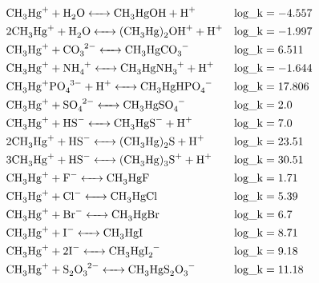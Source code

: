 \documentclass[12pt, a4paper]{article}
\begin{document}
\begin{align}
& \ce{CH3Hg+ + H2O <-> CH3HgOH + H+} && \mathrm{log\_k} =  -4.557 \\
& \ce{2 CH3Hg+ + H2O <-> (CH3Hg)2OH^+ + H+} && \mathrm{log\_k} =  -1.997 \\
& \ce{CH3Hg+ + CO_3^2- <-> CH3HgCO_3^-} && \mathrm{log\_k} =  6.511 \\
& \ce{CH3Hg+ + NH_4^+ <-> CH3HgNH_3^+ + H^+} && \mathrm{log\_k} =  -1.644 \\
& \ce{CH3Hg+ PO_4^3- + H^+ <-> CH3HgHPO_4^-} && \mathrm{log\_k} =  17.806 \\
& \ce{CH3Hg+ + SO_4^2- <-> CH3HgSO_4^-} && \mathrm{log\_k} =  2.0 \\
& \ce{CH3Hg+ + HS- <-> CH3HgS^- + H^+} && \mathrm{log\_k} =  7.0 \\
& \ce{2 CH3Hg+ + HS- <-> (CH3Hg)_2S + H^+} && \mathrm{log\_k} =  23.51 \\
& \ce{3 CH3Hg+ + HS- <-> (CH3Hg)_3S^+ + H^+} && \mathrm{log\_k} =  30.51 \\
& \ce{CH3Hg+ + F- <-> CH3HgF} && \mathrm{log\_k} =  1.71 \\
& \ce{CH3Hg+ + Cl- <-> CH3HgCl} && \mathrm{log\_k} =  5.39 \\
& \ce{CH3Hg+ + Br- <-> CH3HgBr} && \mathrm{log\_k} =  6.7 \\
& \ce{CH3Hg+ + I- <-> CH3HgI} && \mathrm{log\_k} =  8.71 \\
& \ce{CH3Hg+ + 2 I- <-> CH3HgI_2^-} && \mathrm{log\_k} =  9.18 \\
& \ce{CH3Hg+ + S_2O3^2- <-> CH3HgS_2O_3^-} && \mathrm{log\_k} =  11.18
\end{align}
\end{document}
